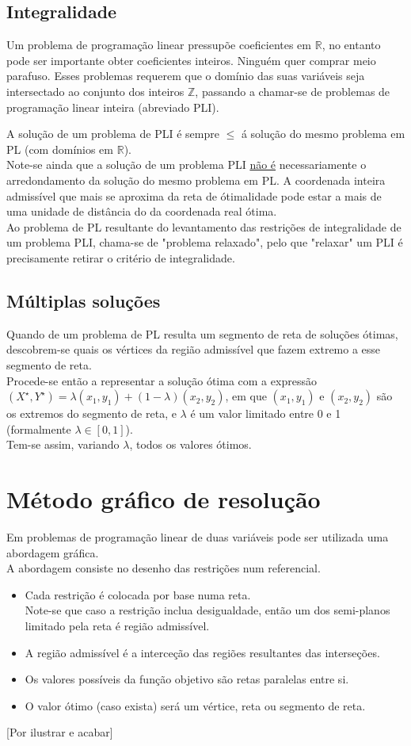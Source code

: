 \documentclass[]{report}
\begin{document}
\subsection{Integralidade}
Um problema de programação linear pressupõe coeficientes em $\mathbb{R}$, no entanto pode ser importante obter coeficientes inteiros. Ninguém quer comprar meio parafuso. Esses problemas requerem que o domínio das suas variáveis seja intersectado ao conjunto dos inteiros $\mathbb{Z}$, passando a chamar-se de problemas de programação linear inteira (abreviado PLI).\\ \par
A solução de um problema de PLI é sempre $\leq$ á solução do mesmo problema em PL (com domínios em $\mathbb{R}$).\\
Note-se ainda que a solução de um problema PLI \underline{não é} necessariamente o arredondamento da solução do mesmo problema em PL. A coordenada inteira admissível que mais se aproxima da reta de ótimalidade pode estar a mais de uma unidade de distância do da coordenada real ótima.\\[0.5cm]
Ao problema de PL resultante do levantamento das restrições de integralidade de um problema PLI, chama-se de "problema relaxado", pelo que "relaxar" um PLI é precisamente retirar o critério de integralidade.
\subsection{Múltiplas soluções}
Quando de um problema de PL resulta um segmento de reta de soluções ótimas, descobrem-se quais os vértices da região admissível que fazem extremo a esse segmento de reta.\\
Procede-se então a representar a solução ótima com a expressão $(X^\star, Y^\star) = \lambda (x_1, y_1)+(1-\lambda)(x_2, y_2)$, em que $(x_1, y_1)$ e $(x_2, y_2)$ são os extremos do segmento de reta, e $\lambda$ é um valor limitado entre 0 e 1 (formalmente $\lambda \in [0,1]$).\\
Tem-se assim, variando $\lambda$, todos os valores ótimos.
\section{Método gráfico de resolução}
Em problemas de programação linear de duas variáveis pode ser utilizada uma abordagem gráfica.\\
A abordagem consiste no desenho das restrições num referencial.
\begin{itemize}
\item Cada restrição é colocada por base numa reta.\\
Note-se que caso a restrição inclua desigualdade, então um dos semi-planos limitado pela reta é região admissível.
\item A região admissível é a interceção das regiões resultantes das interseções.
\item Os valores possíveis da função objetivo são retas paralelas entre si.
\item O valor ótimo (caso exista) será um vértice, reta ou segmento de reta.
\end{itemize}
[Por ilustrar e acabar]
\end{document}
